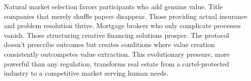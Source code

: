 Natural market selection favors participants who add genuine value. Title companies that merely shuffle papers disappear. Those providing actual insurance and problem resolution thrive. Mortgage brokers who only complicate processes vanish. Those structuring creative financing solutions prosper. The protocol doesn't prescribe outcomes but creates conditions where value creation consistently outcompetes value extraction. This evolutionary pressure, more powerful than any regulation, transforms real estate from a cartel-protected industry to a competitive market serving human needs.